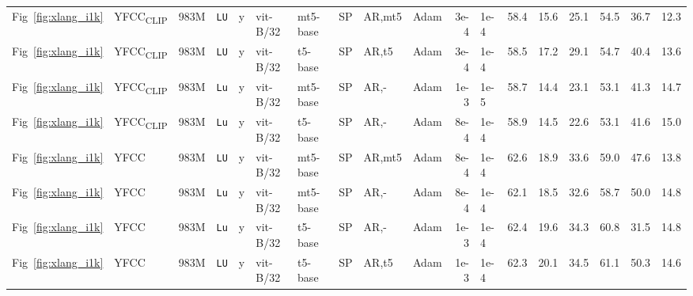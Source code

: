 \documentclass[10pt,twocolumn,letterpaper]{article}
\def \Lu {{\tt Lu}\xspace}
\def \LU {{\tt LU}\xspace}
\begin{document}
\begin{table*}
{\begin{tabular}{@{}llrlll@{\hspace{0.3ex}}llllrlrrrrrr@{}}
    \arrayrulecolor{lightgray}\midrule[0.25pt]\arrayrulecolor{black}
                  Fig~\ref{fig:xlang_i1k} &    YFCC\textsubscript{CLIP} &   983M &  \LU &  y &     vit-B/32 &    mt5-base &  SP &    AR,mt5 &  Adam & 3e-4 &  1e-4 & 58.4 &            15.6 &            25.1 & 54.5 & 36.7 & 12.3 \\
                  Fig~\ref{fig:xlang_i1k} &    YFCC\textsubscript{CLIP} &   983M &  \LU &  y &     vit-B/32 &     t5-base &  SP &     AR,t5 &  Adam & 3e-4 &  1e-4 & 58.5 &            17.2 &            29.1 & 54.7 & 40.4 & 13.6 \\
                  Fig~\ref{fig:xlang_i1k} &    YFCC\textsubscript{CLIP} &   983M &  \Lu &  y &     vit-B/32 &    mt5-base &  SP &      AR,- &  Adam & 1e-3 &  1e-5 & 58.7 &            14.4 &            23.1 & 53.1 & 41.3 & 14.7 \\
                  Fig~\ref{fig:xlang_i1k} &    YFCC\textsubscript{CLIP} &   983M &  \Lu &  y &     vit-B/32 &     t5-base &  SP &      AR,- &  Adam & 8e-4 &  1e-4 & 58.9 &            14.5 &            22.6 & 53.1 & 41.6 & 15.0 \\
    \arrayrulecolor{lightgray}\midrule[0.25pt]\arrayrulecolor{black}
                  Fig~\ref{fig:xlang_i1k} &    YFCC &   983M &  \LU &  y &     vit-B/32 &    mt5-base &  SP &    AR,mt5 &  Adam & 8e-4 &  1e-4 & 62.6 &            18.9 &            33.6 & 59.0 & 47.6 & 13.8 \\
                  Fig~\ref{fig:xlang_i1k} &    YFCC &   983M &  \Lu &  y &     vit-B/32 &    mt5-base &  SP &      AR,- &  Adam & 8e-4 &  1e-4 & 62.1 &            18.5 &            32.6 & 58.7 & 50.0 & 14.8 \\
                  Fig~\ref{fig:xlang_i1k} &    YFCC &   983M &  \Lu &  y &     vit-B/32 &     t5-base &  SP &      AR,- &  Adam & 1e-3 &  1e-4 & 62.4 &            19.6 &            34.3 & 60.8 & 31.5 & 14.8 \\
                  Fig~\ref{fig:xlang_i1k} &    YFCC &   983M &  \LU &  y &     vit-B/32 &     t5-base &  SP &     AR,t5 &  Adam & 1e-3 &  1e-4 & 62.3 &            20.1 &            34.5 & 61.1 & 50.3 & 14.6 \\
\bottomrule
\end{tabular}}



\end{table*}
\end{document}
